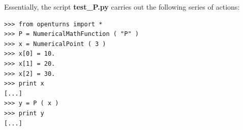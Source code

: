 Essentially, the script {\bf test\_P.py} carries out the following series of actions:

\lstset{language=Python, basicstyle=\normalsize}
\begin{lstlisting}[frame=TBRL]
>>> from openturns import *
>>> P = NumericalMathFunction ( "P" )
>>> x = NumericalPoint ( 3 )
>>> x[0] = 10.
>>> x[1] = 20.
>>> x[2] = 30.
>>> print x
[...]
>>> y = P ( x )
>>> print y
[...]
\end{lstlisting}
